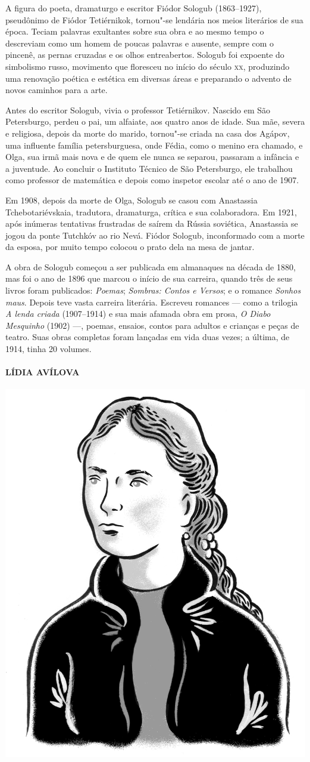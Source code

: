 \noindent{}A figura do poeta, dramaturgo e escritor Fiódor Sologub (1863--1927),
pseudônimo de Fiódor Tetiérnikok, tornou"-se lendária nos meios
literários de sua época. Teciam palavras exultantes sobre sua obra e ao
mesmo tempo o descreviam como um homem de poucas palavras e ausente,
sempre com o pincenê, as pernas cruzadas e os olhos entreabertos.
Sologub foi expoente do simbolismo russo, movimento que floresceu no início do
século \textsc{xx}, produzindo uma renovação poética e estética em diversas áreas
e preparando o advento de novos caminhos para a arte.

Antes do escritor Sologub, vivia o professor Tetiérnikov. Nascido em São
Petersburgo, perdeu o pai, um alfaiate, aos quatro anos de idade. Sua
mãe, severa e religiosa, depois da morte do marido, tornou"-se criada na
casa dos Agápov, uma influente família petersburguesa, onde Fédia, como
o menino era chamado, e Olga, sua irmã mais nova e de quem ele nunca se
separou, passaram a infância e a juventude. Ao concluir o Instituto
Técnico de São Petersburgo, ele trabalhou como professor de matemática e
depois como inspetor escolar até o ano de 1907.

Em 1908, depois da morte de Olga, Sologub se casou com Anastassia
Tchebotariévskaia, tradutora, dramaturga, crítica e sua colaboradora. Em
1921, após inúmeras tentativas frustradas de saírem da Rússia soviética,
Anastassia se jogou da ponte Tutchkóv ao rio Nevá. Fiódor Sologub,
inconformado com a morte da esposa, por muito tempo colocou o prato dela
na mesa de jantar.

A obra de Sologub começou a ser publicada em almanaques na década de
1880, mas foi o ano de 1896 que marcou o início de sua carreira, quando
três de seus livros foram publicados: \emph{Poemas}; \emph{Sombras:
Contos e Versos}; e o romance \emph{Sonhos maus}. Depois teve vasta
carreira literária. Escreveu romances --- como a trilogia \emph{A lenda
criada} (1907--1914) e sua mais afamada obra em
prosa, \emph{O Diabo Mesquinho} (1902) ---, poemas,
ensaios, contos para adultos e crianças e peças de teatro. Suas obras
completas foram lançadas em vida duas vezes; a última, de 1914, tinha 20
volumes.

\paragraph{LÍDIA AVÍLOVA}

\noindent\includegraphics[width=.8in]{./imgs/autor8.jpg}

